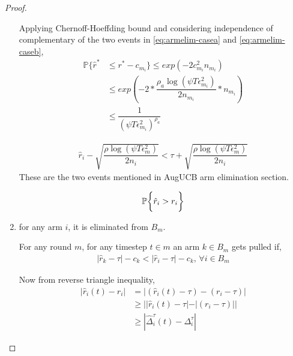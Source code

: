 \begin{proof}
\begin{enumerate}
Applying Chernoff-Hoeffding bound and considering independence of complementary of the two events in \ref{eq:armelim-casea} and \ref{eq:armelim-caseb},
  \begin{align*}
\mathbb{P}\lbrace\hat{r}^{*}&\leq r^{*} - c_{m_{i}}\rbrace\leq exp(-2c_{m_{i}}^{2}n_{m_{i}})\\
&\leq exp(-2 * \dfrac{\rho_{a}\log (\psi T\epsilon_{m_{i}}^{2})}{2 n_{m_{i}}} *n_{m_{i}})\\
&\leq \dfrac{1}{(\psi T\epsilon_{m_{i}}^{2})^{\rho_{a}}}   
  \end{align*}




\begin{align*}
\hat{r}_{i} - \sqrt{\dfrac{\rho\log{(\psi T\epsilon_{m}^{2})}}{2 n_{i}}}  < \tau +\sqrt{\dfrac{\rho\log{(\psi T\epsilon_{m}^{2})}}{2 n_{i}}} 
\end{align*}
These are the two events mentioned in AugUCB arm elimination section.

\begin{align*}
\mathbb{P}\bigg\lbrace \hat{r}_{i} > r_{i}  \bigg\rbrace
\end{align*}

\item for any arm $i$, it is eliminated from $B_{m}$.

	For any round $m$, for any timestep $t\in m$ an arm $k\in B_{m}$ gets pulled if,
\begin{align*}
|\hat{r}_{k} - \tau| - c_{k} < |\hat{r}_{i} - \tau| - c_{k} \text{, } \forall i\in B_{m}
\end{align*}

Now from reverse triangle inequality,
\begin{align*}
|\hat{r}_{i}(t) - r_{i}|&=|(\hat{r}_{i}(t)-\tau) - (r_{i}-\tau)|\\
&\geq ||\hat{r}_{i}(t)-\tau|-|(r_{i}-\tau)||\\
&\geq |\hat{\Delta}_{i}^{\tau}(t) - \Delta_{i}^{\tau}|
\end{align*}

\end{enumerate}

\end{proof}